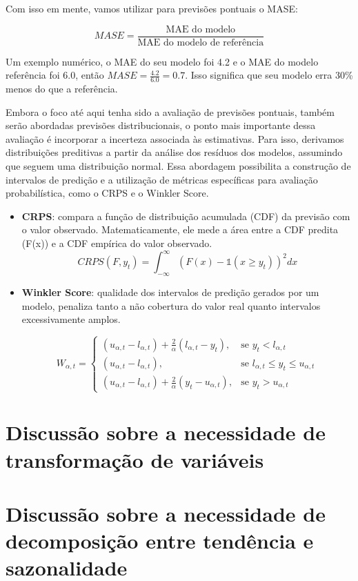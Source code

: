 \documentclass{article}
\begin{document}
Com isso em mente, vamos utilizar para previsões pontuais o MASE:

$$MASE = \dfrac{\text{MAE do modelo}}{\text{MAE do modelo de referência}}$$

Um exemplo numérico, o MAE do seu modelo foi 4.2 e  o MAE do modelo referência foi 6.0, então $MASE
=\frac{4.2}{6.0}= 0.7$. Isso significa que seu modelo erra 30\% menos do que a referência.

Embora o foco até aqui tenha sido a avaliação de previsões pontuais, também serão abordadas previsões distribucionais, o ponto mais importante dessa avaliação é incorporar a incerteza associada às estimativas.
Para isso, derivamos distribuições preditivas a partir da análise dos resíduos dos modelos, assumindo que seguem uma distribuição normal. Essa abordagem possibilita a construção de intervalos de predição e a utilização de métricas específicas para avaliação probabilística, como o CRPS e o Winkler Score.
\begin{itemize}
    \item \textbf{CRPS}: compara a função de distribuição acumulada (CDF) da previsão com o valor observado. Matematicamente, ele mede a área entre a CDF predita (F(x)) e a CDF empírica do valor observado.
    $$CRPS(F, y_t) = \int_{-\infty}^{\infty}(F(x)- \mathbb{1}(x \geq y_t))^2 dx $$
    \item \textbf{Winkler Score}: qualidade dos intervalos de predição gerados por um modelo, penaliza tanto a não cobertura do valor real quanto intervalos excessivamente amplos.

    $$
W_{\alpha, t} = 
\begin{cases}
(u_{\alpha, t} - l_{\alpha, t}) + \frac{2}{\alpha} (l_{\alpha, t} - y_t), & \text{se } y_t < l_{\alpha, t} \\
(u_{\alpha, t} - l_{\alpha, t}), & \text{se } l_{\alpha, t} \leq y_t \leq u_{\alpha, t} \\
(u_{\alpha, t} - l_{\alpha, t}) + \frac{2}{\alpha} (y_t - u_{\alpha, t}), & \text{se } y_t > u_{\alpha, t}
\end{cases}
    $$
\end{itemize}


\section{Discussão sobre a necessidade de transformação de variáveis}


\section{Discussão sobre a necessidade de decomposição entre tendência e sazonalidade}
\end{document}
